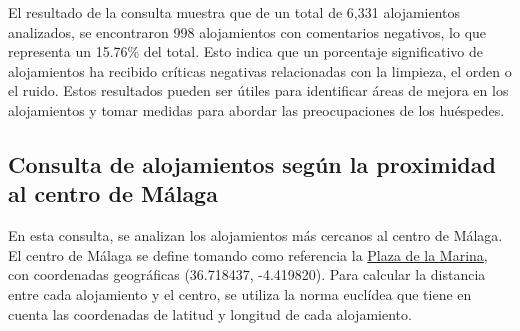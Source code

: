 El resultado de la consulta muestra que de un total de 6,331 alojamientos analizados, se encontraron 998 alojamientos con comentarios negativos, lo que representa un 15.76\% del total. Esto indica que un porcentaje significativo de alojamientos ha recibido críticas negativas relacionadas con la limpieza, el orden o el ruido. Estos resultados pueden ser útiles para identificar áreas de mejora en los alojamientos y tomar medidas para abordar las preocupaciones de los huéspedes.

\subsection{Consulta de alojamientos según la proximidad al centro de Málaga}
En esta consulta, se analizan los alojamientos más cercanos al centro de Málaga. El centro de Málaga se define tomando como referencia la \href{https://goo.gl/maps/xrUY9dtNfTsoRzKj9}{Plaza de la Marina}, con coordenadas geográficas (36.718437, -4.419820). Para calcular la distancia entre cada alojamiento y el centro, se utiliza  la norma euclídea que tiene en cuenta las coordenadas de latitud y longitud de cada alojamiento.

